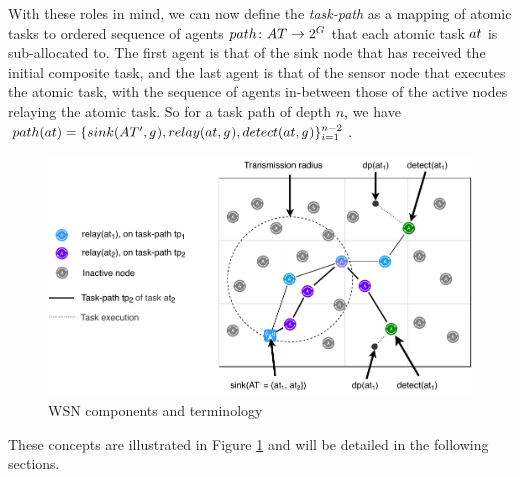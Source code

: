 With these roles in mind, we can now define the  \textit{task-path} as a mapping of atomic tasks to ordered sequence of agents $\formalTaskArc{}{}$ that each atomic task $\varAtomicTask{}{}$ is sub-allocated to. The first agent is that of the sink node that has received the initial composite task, and the last agent is that of the sensor node that executes the atomic task, with the sequence of agents in-between those of the active nodes relaying the atomic task. So for a task path of depth $n$, we have
$\functionTaskArc{}{} = \lbrace \functionSinkRole{}{}, \functionRelayRole{i}{}, \functionDetectorRole{}{} \rbrace_{i=1}^{n-2}$. 


\begin{figure}
	\centering 
	\includegraphics[width=0.9\linewidth, trim={25pt 0pt 24pt 0pt, clip}]{grid_concept}
	\caption[WSN deployment terminology]{WSN components and terminology}
	\label{fig:grid_concept}
\end{figure}


 These concepts are illustrated in Figure \ref{fig:grid_concept} and will be detailed in the following sections.


